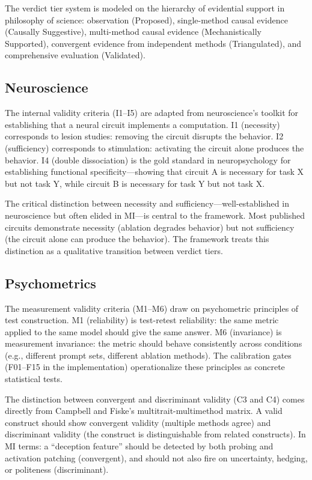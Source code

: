 \documentclass[10pt]{article}
\newcommand{\eg}{e.g.}
\begin{document}
The verdict tier system is modeled on the hierarchy of evidential support in philosophy of science: observation (Proposed), single-method causal evidence (Causally Suggestive), multi-method causal evidence (Mechanistically Supported), convergent evidence from independent methods (Triangulated), and comprehensive evaluation (Validated).

\subsection{Neuroscience}
\label{sec:neuro}

The internal validity criteria (I1--I5) are adapted from neuroscience's toolkit for establishing that a neural circuit implements a computation. I1 (necessity) corresponds to lesion studies: removing the circuit disrupts the behavior. I2 (sufficiency) corresponds to stimulation: activating the circuit alone produces the behavior. I4 (double dissociation) is the gold standard in neuropsychology for establishing functional specificity---showing that circuit A is necessary for task X but not task Y, while circuit B is necessary for task Y but not task X.

The critical distinction between necessity and sufficiency---well-established in neuroscience but often elided in MI---is central to the framework. Most published circuits demonstrate necessity (ablation degrades behavior) but not sufficiency (the circuit alone can produce the behavior). The framework treats this distinction as a qualitative transition between verdict tiers.

\subsection{Psychometrics}
\label{sec:psychometrics}

The measurement validity criteria (M1--M6) draw on psychometric principles of test construction. M1 (reliability) is test-retest reliability: the same metric applied to the same model should give the same answer. M6 (invariance) is measurement invariance: the metric should behave consistently across conditions (\eg, different prompt sets, different ablation methods). The calibration gates (F01--F15 in the implementation) operationalize these principles as concrete statistical tests.

The distinction between convergent and discriminant validity (C3 and C4) comes directly from Campbell and Fiske's multitrait-multimethod matrix. A valid construct should show convergent validity (multiple methods agree) and discriminant validity (the construct is distinguishable from related constructs). In MI terms: a ``deception feature'' should be detected by both probing and activation patching (convergent), and should not also fire on uncertainty, hedging, or politeness (discriminant).
\end{document}
